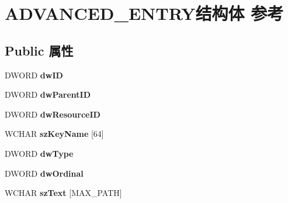 \hypertarget{struct_a_d_v_a_n_c_e_d___e_n_t_r_y}{}\section{A\+D\+V\+A\+N\+C\+E\+D\+\_\+\+E\+N\+T\+R\+Y结构体 参考}
\label{struct_a_d_v_a_n_c_e_d___e_n_t_r_y}
\subsection*{Public 属性}
\begin{DoxyCompactItemize}
\item 
\mbox{\label{struct_a_d_v_a_n_c_e_d___e_n_t_r_y_ac030b5f21974f6218a5e4745567483ff}} 
D\+W\+O\+RD {\bfseries dw\+ID}
\item 
\mbox{\label{struct_a_d_v_a_n_c_e_d___e_n_t_r_y_a374cbbd7957196b569233844dd675b6d}} 
D\+W\+O\+RD {\bfseries dw\+Parent\+ID}
\item 
\mbox{\label{struct_a_d_v_a_n_c_e_d___e_n_t_r_y_a0877e20bb9079e395bcbdba8bd1b3e42}} 
D\+W\+O\+RD {\bfseries dw\+Resource\+ID}
\item 
\mbox{\label{struct_a_d_v_a_n_c_e_d___e_n_t_r_y_acf53ddbf1886af5a02ff8c788aeda8e6}} 
W\+C\+H\+AR {\bfseries sz\+Key\+Name} \mbox{[}64\mbox{]}
\item 
\mbox{\label{struct_a_d_v_a_n_c_e_d___e_n_t_r_y_aca2136faec280ea0ce026b5ed41fbfca}} 
D\+W\+O\+RD {\bfseries dw\+Type}
\item 
\mbox{\label{struct_a_d_v_a_n_c_e_d___e_n_t_r_y_af3f3522e814a9bf7a7f08b37b19a86e5}} 
D\+W\+O\+RD {\bfseries dw\+Ordinal}
\item 
\mbox{\label{struct_a_d_v_a_n_c_e_d___e_n_t_r_y_ab57f3e84122c905f6219dff7f6ce5064}} 
W\+C\+H\+AR {\bfseries sz\+Text} \mbox{[}M\+A\+X\+\_\+\+P\+A\+TH\mbox{]}
\item 
\mbox{\label{struct_a_d_v_a_n_c_e_d___e_n_t_r_y_a57dbc0cf3b1aad4f0066b5bcc7c10340}} 

\end{DoxyCompactItemize}
